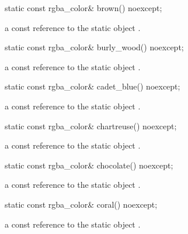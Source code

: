 \begin{itemdecl}
static const rgba_color& brown() noexcept;
\end{itemdecl}
\begin{itemdescr}
\pnum
\returns
a const reference to the static  object .
\end{itemdescr}

\begin{itemdecl}
static const rgba_color& burly_wood() noexcept;
\end{itemdecl}
\begin{itemdescr}
\pnum
\returns
a const reference to the static  object .
\end{itemdescr}

\begin{itemdecl}
static const rgba_color& cadet_blue() noexcept;
\end{itemdecl}
\begin{itemdescr}
\pnum
\returns
a const reference to the static  object .
\end{itemdescr}

\begin{itemdecl}
static const rgba_color& chartreuse() noexcept;
\end{itemdecl}
\begin{itemdescr}
\pnum
\returns
a const reference to the static  object .
\end{itemdescr}

\begin{itemdecl}
static const rgba_color& chocolate() noexcept;
\end{itemdecl}
\begin{itemdescr}
\pnum
\returns
a const reference to the static  object .
\end{itemdescr}

\begin{itemdecl}
static const rgba_color& coral() noexcept;
\end{itemdecl}
\begin{itemdescr}
\pnum
\returns
a const reference to the static  object .
\end{itemdescr}

